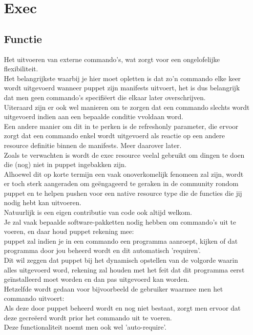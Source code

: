 \section{Exec}
\subsection{Functie}
	Het uitvoeren van externe commando's, wat zorgt voor een ongelofelijke flexibiliteit.\\
	Het belangrijkste waarbij je hier moet opletten is dat zo'n commando elke keer wordt uitgevoerd wanneer puppet zijn manifests uitvoert, het is dus belangrijk dat men geen commando's specifi\"{e}ert die elkaar later overschrijven.\\
	Uiteraard zijn er ook wel manieren om te zorgen dat een commando slechts wordt uitgevoerd indien aan een bepaalde conditie vvoldaan word.\\
	Een andere manier om dit in te perken is de refreshonly parameter, die ervoor zorgt dat een commando enkel wordt uitgevoerd als reactie op een andere resource definitie binnen de manifests. Meer daarover later.\\

	Zoals te verwachten is wordt de exec resource veelal gebruikt om dingen te doen die (nog) niet in puppet ingebakken zijn.\\
	Alhoewel dit op korte termijn een vaak onoverkomelijk fenomeen zal zijn, wordt er toch sterk aangeraden om ge\"{e}ngageerd te geraken in de community rondom puppet en te helpen pushen voor een native resource type die de functies die jij nodig hebt kan uitvoeren.\\
	Natuurlijk is een eigen contributie van code ook altijd welkom.\\

	Je zal vaak bepaalde software-pakketten nodig hebben om commando's uit te voeren, en daar houd puppet rekening mee:\\
	puppet zal indien je in een commando een programma aanroept, kijken of dat programma door jou beheerd wordt en dit automatisch 'requiren'.\\
	Dit wil zeggen dat puppet bij het dynamisch opstellen van de volgorde waarin alles uitgevoerd word, rekening zal houden met het feit dat dit programma eerst ge\"installeerd moet worden en dan pas uitgevoerd kan worden.\\
	Hetzelfde wordt gedaan voor bijvoorbeeld de gebruiker waarmee men het commando uitvoert:\\
	Als deze door puppet beheerd wordt en nog niet bestaat, zorgt men ervoor dat deze gecre\"{e}erd wordt prior het commando uit te voeren.\\
	Deze functionaliteit noemt men ook wel 'auto-require'.\\

